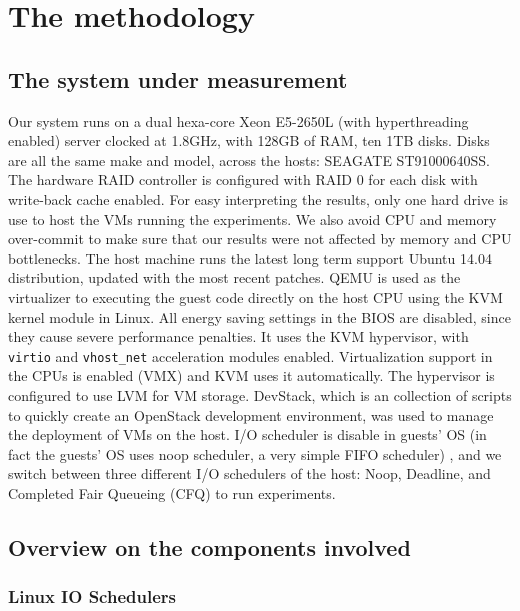 \documentclass{acmsig}
\begin{document}
\section{The methodology}

\subsection{The system under measurement}

Our system runs on a dual hexa-core Xeon E5-2650L (with hyperthreading enabled) server clocked at 1.8GHz, with 128GB of RAM, ten 1TB disks. Disks are all the same make and model, across the hosts: SEAGATE ST91000640SS. The hardware RAID controller is configured with RAID 0 for each disk with write-back cache enabled. For easy interpreting the results, only one hard drive is use to host the VMs running the experiments. We also avoid  CPU and memory over-commit to make sure that our results were not affected by memory and CPU bottlenecks. The host machine runs the latest long term support Ubuntu 14.04 distribution, updated with the most recent patches. QEMU is used as the virtualizer to executing the guest code directly on the host CPU using the KVM kernel module in Linux. All energy saving settings in the BIOS are disabled, since they cause severe performance penalties. It uses the KVM hypervisor, with \texttt{virtio} and \texttt{vhost\_net} acceleration modules enabled. Virtualization support in the CPUs is enabled (VMX) and KVM uses it automatically. The hypervisor is configured to use LVM for VM storage. DevStack, which is an collection of scripts to quickly create an OpenStack development environment, was used to manage the deployment of VMs on the host. I/O scheduler is disable in guests' OS (in fact the guests' OS uses noop scheduler, a very simple FIFO scheduler) , and we switch between three different I/O schedulers of the host: Noop, Deadline, and Completed Fair Queueing (CFQ) to run experiments.
\subsection{Overview on the components involved}
  \subsubsection{Linux IO Schedulers}
\end{document}
